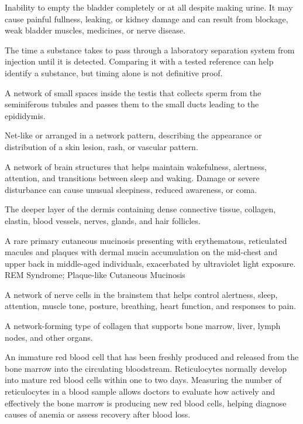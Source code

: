  Inability to empty the bladder completely or at all despite making urine. It may cause painful fullness, leaking, or kidney damage and can result from blockage, weak bladder muscles, medicines, or nerve disease.

 The time a substance takes to pass through a laboratory separation system from injection until it is detected. Comparing it with a tested reference can help identify a substance, but timing alone is not definitive proof.

 A network of small spaces inside the testis that collects sperm from the seminiferous tubules and passes them to the small ducts leading to the epididymis.

 Net-like or arranged in a network pattern, describing the appearance or distribution of a skin lesion, rash, or vascular pattern.

 A network of brain structures that helps maintain wakefulness, alertness, attention, and transitions between sleep and waking. Damage or severe disturbance can cause unusual sleepiness, reduced awareness, or coma.

 The deeper layer of the dermis containing dense connective tissue, collagen, elastin, blood vessels, nerves, glands, and hair follicles.

 A rare primary cutaneous mucinosis presenting with erythematous, reticulated macules and plaques with dermal mucin accumulation on the mid-chest and upper back in middle-aged individuals, exacerbated by ultraviolet light exposure.
\synonyms
REM Syndrome; Plaque-like Cutaneous Mucinosis

 A network of nerve cells in the brainstem that helps control alertness, sleep, attention, muscle tone, posture, breathing, heart function, and responses to pain.

 A network-forming type of collagen that supports bone marrow, liver, lymph nodes, and other organs.

 An immature red blood cell that has been freshly produced and released from the bone marrow into the circulating bloodstream. Reticulocytes normally develop into mature red blood cells within one to two days. Measuring the number of reticulocytes in a blood sample allows doctors to evaluate how actively and effectively the bone marrow is producing new red blood cells, helping diagnose causes of anemia or assess recovery after blood loss.

